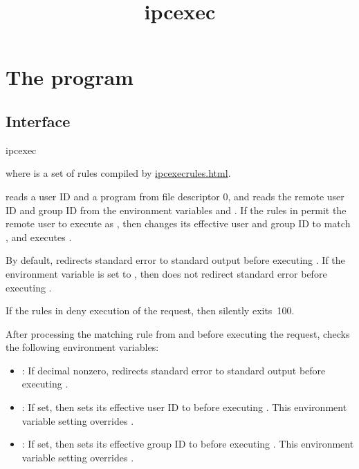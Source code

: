 \documentclass{book}
\title{ipcexec}
\begin{document}
\section{The  program}

\subsection{Interface}
\begin{code}%
  ipcexec 
\end{code}
where  is a set of rules compiled by
\href{\cmd{ipcexecrules}}{ipcexecrules.html}.

 reads a user ID  and a program  from file
descriptor 0, and reads the remote user ID and group ID from the environment
variables  and .  If the rules in
 permit the remote user to execute  as , then
 changes its effective user and group ID to match ,
and executes .

By default,  redirects standard error to standard output before
executing .  If the  environment variable is set to
, then  does not redirect standard error before executing
.

If the rules in  deny execution of the request, then 
silently exits~100.


After processing the matching rule from  and before executing the
request,  checks the following environment variables:
\begin{itemize}
\item {}:
If decimal nonzero,  redirects standard error to standard output
before executing .

\item {}:
If set, then  sets its effective user ID to  before
executing .  This environment variable setting overrides .

\item {}:
If set, then  sets its effective group ID to  before
executing .  This environment variable setting overrides .
\end{itemize}
\end{document}
